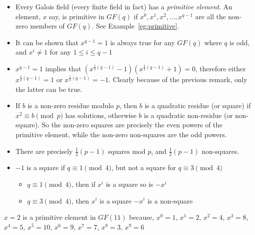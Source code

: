 \begin{itemize}

\item{Every Galois field (every finite field in fact) has a
\emph{primitive element}.
An element, $x$ say, is primitive in $GF(q)$ if
$x^0, x^1, x^2, \ldots, x^{q - 1}$
are all the non-zero members of $GF(q)$.
See Example~\ref{eg:primitive}.}

\item{It can be shown
\cite{boseResolvableSeriesBalanced1947}
that $x^{q - 1} = 1$ is always true for any $GF(q)$ where $q$ is odd, and $x^i \neq 1$ for any $1 \leq i \leq q - 1$}

\item{$x^{q-1}=1$ implies that $(x^{\frac{1}{2}(q - 1)} - 1)(x^{\frac{1}{2}(q - 1)} + 1) = 0$, therefore either $x^{\frac{1}{2}(q - 1)} = 1$ or $x^{\frac{1}{2}(q - 1)} = -1$.
Clearly because of the previous remark, only the latter can be true.}

\item{If $b$ is a non-zero residue modulo $p$, then $b$ is a quadratic residue (or square) if $x^2 \equiv b \pmod p$ has solutions, otherwise $b$ is a quadratic non-residue (or non-square).
So the non-zero squares are precisely the even powers of the primitive element, while the non-zero non-squares are the odd powers.}

\item{There are precisely $\frac{1}{2}(p - 1)$ squares mod $p$, and $\frac{1}{2}(p - 1)$ non-squares.}

\item{$-1$ is a square if $q \equiv 1 \pmod 4$, but not a square for $q \equiv 3 \pmod 4$
\begin{itemize}
  \item{$q \equiv 1 \pmod 4$, then if $x^i$ is a square so is $-x^i$}
  \item{$q \equiv 3 \pmod 4$, then $x^i$ is a square $-x^i$ is a non-square}
\end{itemize}}

\end{itemize}

\begin{example}
$x = 2$ is a primitive element in $GF(11)$ because, $x^0 = 1$, $x^1 = 2$, $x^2 = 4$, $x^3 = 8$, $x^4 = 5$, $x^5 = 10$, $x^6 = 9$, $x^7 = 7$, $x^8 = 3$, $x^9 = 6$
\label{eg:primitive}
\end{example}
